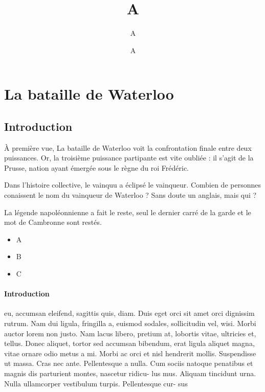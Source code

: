 \documentclass[12pt]{report}
\title{#1}
\author{#2}
\date{#3}
\newcommand{\setHeader}[3]{
\title{#1}
\author{#2}
\date{#3}
\maketitle
}
\newcommand{\Triangle}{$\blacktriangleright$}
\newenvironment{items}[2]
{      
        \begin{itemize}[font=\color{#1}, label=#2]
           
    }
    { 
        \end{itemize}

}%
\begin{document}
\setHeader{A}{A}{A}
\tableofcontents
\setcounter{page}{2}
  
\chapter{La bataille de Waterloo}

\section{Introduction}

À première vue, La bataille de Waterloo voit la confrontation finale entre deux puissances. Or, la troisième puissance partipante est vite oubliée : il s'agit de la Prusse, nation ayant émergée sous le règne du roi Frédéric.

Dans l'histoire collective, le vainquu a éclipsé le vainqueur. Combien de personnes conaissent le nom du vainqueur de Waterloo ? Sans doute un anglais, mais qui ?

La légende napoléonnienne a fait le reste, seul le dernier carré de la garde et le mot de Cambronne sont restés.



\begin{items}{orange}{\Triangle}
    \item A
    \item B
    \item C
\end{items}

\subsubsection{Introduction}

eu, accumsan eleifend, sagittis quis, diam. Duis eget orci sit amet orci dignissim rutrum.
Nam dui ligula, fringilla a, euismod sodales, sollicitudin vel, wisi. Morbi auctor lorem
non justo. Nam lacus libero, pretium at, lobortis vitae, ultricies et, tellus. Donec aliquet,
tortor sed accumsan bibendum, erat ligula aliquet magna, vitae ornare odio metus a mi.
Morbi ac orci et nisl hendrerit mollis. Suspendisse ut massa. Cras nec ante. Pellentesque
a nulla. Cum sociis natoque penatibus et magnis dis parturient montes, nascetur ridicu-
lus mus. Aliquam tincidunt urna. Nulla ullamcorper vestibulum turpis. Pellentesque cur-
sus
\end{document}
